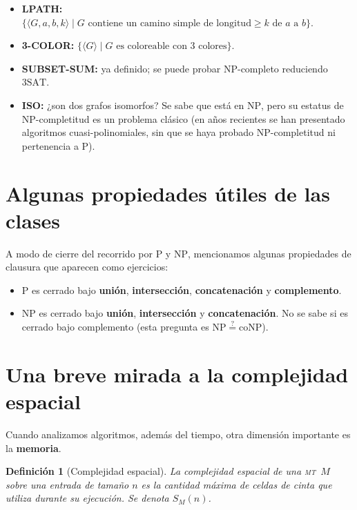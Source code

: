 \documentclass[11pt,a4paper]{article}
\theoremstyle{definicion}
\newtheorem{definicion}{Definición}[section]
\newcommand{\MT}{\textsc{mt}}
\newcommand{\enc}[1]{\langle #1 \rangle}
\newcommand{\NP}{\mathrm{NP}}
\newcommand{\Pclass}{\mathrm{P}}
\begin{document}
\begin{itemize}
    \item \textbf{LPATH:} $\{\enc{G, a, b, k} \mid G \text{ contiene un camino simple de longitud} \geq k \text{ de } a \text{ a } b\}$.
    \item \textbf{3-COLOR:} $\{\enc{G} \mid G \text{ es coloreable con 3 colores}\}$.
    \item \textbf{SUBSET-SUM:} ya definido; se puede probar NP-completo reduciendo $3\mathrm{SAT}$.
    \item \textbf{ISO:} ¿son dos grafos isomorfos? Se sabe que está en $\NP$, pero su estatus de NP-completitud es un problema clásico (en años recientes se han presentado algoritmos cuasi-polinomiales, sin que se haya probado NP-completitud ni pertenencia a $\Pclass$).
\end{itemize}

\section{Algunas propiedades útiles de las clases}

A modo de cierre del recorrido por $\Pclass$ y $\NP$, mencionamos algunas propiedades de clausura que aparecen como ejercicios:

\begin{itemize}
    \item $\Pclass$ es cerrado bajo \textbf{unión}, \textbf{intersección}, \textbf{concatenación} y \textbf{complemento}.
    \item $\NP$ es cerrado bajo \textbf{unión}, \textbf{intersección} y \textbf{concatenación}. No se sabe si es cerrado bajo complemento (esta pregunta es $\NP \overset{?}{=} \mathrm{coNP}$).
\end{itemize}

\section{Una breve mirada a la complejidad espacial}

Cuando analizamos algoritmos, además del tiempo, otra dimensión importante es la \textbf{memoria}.

\begin{definicion}[Complejidad espacial]
La complejidad espacial de una \MT\ $M$ sobre una entrada de tamaño $n$ es la \emph{cantidad máxima de celdas de cinta} que utiliza durante su ejecución. Se denota $S_M(n)$.
\end{definicion}
\end{document}
